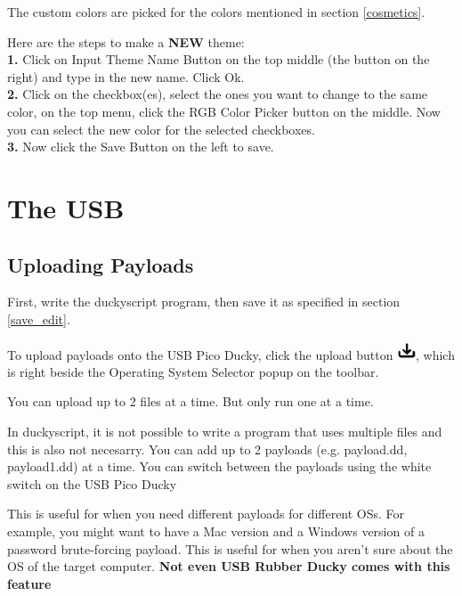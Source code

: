 \documentclass[a4paper,12pt]{article}
\begin{document}
The custom colors are picked for the colors mentioned in section \ref{cosmetics}.

Here are the steps to make a \textbf{NEW} theme:\\
\textbf{1.} Click on \colorbox{WhiteSmoke!70!Lavender}{Input Theme Name} Button on the top middle (the button on the right) and type in the new name. Click \colorbox{WhiteSmoke!70!Lavender}{Ok}.\\
\textbf{2.} Click on the checkbox(es), select the ones you want to change to the same color, on the top menu, click the \colorbox{WhiteSmoke!70!Lavender}{RGB Color Picker} button on the middle. Now you can select the new color for the selected checkboxes.\\
\textbf{3.} Now click the \colorbox{WhiteSmoke!70!Lavender}{Save} Button on the left to save.\\

\section{The USB}

\subsection{Uploading Payloads}\label{upload_payloads}

First, write the duckyscript program, then save it as specified in section \ref{save_edit}.

To upload payloads onto the USB Pico Ducky, click the upload button \includegraphics[width=5.5mm]{pictures/white_bk/upload.png}, which is right beside the Operating System Selector popup on the toolbar.

You can upload up to 2 files at a time. But only run one at a time.

In duckyscript, it is not possible to write a program that uses multiple files and this is also not necesarry. You can add up to 2 payloads (e.g. payload.dd, payload1.dd) at a time. You can switch between the payloads using the white switch on the USB Pico Ducky

This is useful for when you need different payloads for different OSs. For example, you might want to have a Mac version and a Windows version of a password brute-forcing payload. This is useful for when you aren't sure about the OS of the target computer. \textbf{Not even USB Rubber Ducky comes with this feature}
\end{document}
